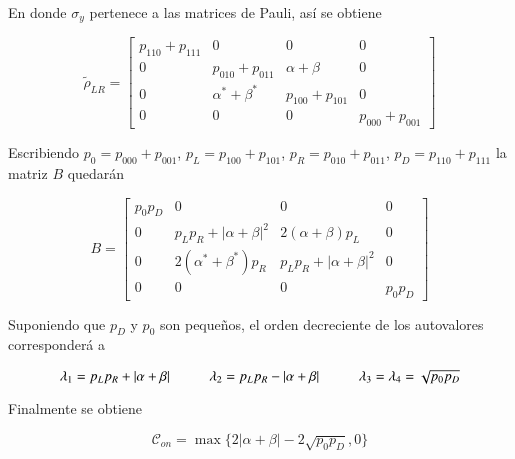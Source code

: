 \begin{appendixs}
En donde $\sigma_{y}$ pertenece a las matrices de Pauli, así se obtiene

\begin{equation*}
    \tilde{\rho}_{LR} = 
    \begin{bmatrix}
        p_{110}+p_{111} & 0 & 0 & 0  \\
        0 & p_{010} + p_{011} & \alpha + \beta & 0  \\
        0 & \alpha^{*} +\beta^{*} & p_{100} + p_{101} & 0  \\
        0 & 0 & 0 & p_{000} + p_{001} 
        \end{bmatrix}
\end{equation*}

Escribiendo $p_{0}=p_{000}+p_{001}$, $p_{L}=p_{100} + p_{101}$, $p_{R}=p_{010}+p_{011}$, $p_{D}=p_{110}+p_{111}$ la matriz $B$ quedarán

\begin{equation*}
    B = 
    \begin{bmatrix}
        p_{0}p_{D} & 0 & 0 & 0  \\
        0 & p_{L}p_{R}+|\alpha+\beta|^{2} & 2(\alpha + \beta)p_{L} & 0  \\
        0 & 2(\alpha^{*} +\beta^{*})p_{R} & p_{L}p_{R}+|\alpha+\beta|^{2}  & 0  \\
        0 & 0 & 0 & p_{0}p_{D}
        \end{bmatrix}
\end{equation*}

Suponiendo que $p_{D}$ y $p_{0}$ son pequeños, el orden decreciente de los autovalores corresponderá a

\begin{equation*}
    \lambda_{1} = p_{L}p_{R} + |\alpha + \beta| \hspace{10mm}  \lambda_{2} = p_{L}p_{R} - |\alpha + \beta| \hspace{10mm} \lambda_{3}=\lambda_{4} = \sqrt{p_{0}p_{D}}
\end{equation*}

Finalmente se obtiene

\begin{equation*}
    \mathcal{C}_{on} = \max\{ 2|\alpha+\beta| - 2\sqrt{p_{0}p_{D}},0\}
\end{equation*}



\label{appendix5final}

\end{appendixs}